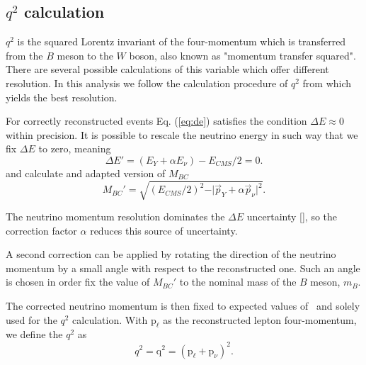\subsection{\texorpdfstring{$q^2$}{q2} calculation}
$q^2$ is the squared Lorentz invariant of the four-momentum which is transferred from the $B$ meson to the $W$ boson, also known as "momentum transfer squared". There are several possible calculations of this variable which offer different resolution. In this analysis we follow the calculation procedure of $q^2$ from \cite{VubCLEO} which yields the best resolution.

For correctly reconstructed events Eq. (\ref{eq:de}) satisfies the condition $\Delta E \approx 0$ within precision. It is possible to rescale the neutrino energy in such way that we fix $\Delta E$ to zero, meaning 
\begin{equation}
\Delta E' = (E_Y + \alpha E_\nu) - E_{CMS}/2 = 0.
\end{equation}
and calculate and adapted version of $M_{BC}$
\begin{equation}
M_{BC}' = \sqrt{\left(E_{CMS}/2\right)^2 - \vert \vec{p}_Y + \alpha \vec{p}_\nu \vert^2}.
\end{equation}

The neutrino momentum resolution dominates the $\Delta E$ uncertainty [], so the correction factor $\alpha$ reduces this source of uncertainty.

A second correction can be applied by rotating the direction of the neutrino momentum by a small angle with respect to the reconstructed one. Such an angle is chosen in order fix the value of $M_{BC}'$ to the nominal mass of the $B$ meson, $m_B$.

The corrected neutrino momentum is then fixed to expected values of \vars~and solely used for the $q^2$ calculation. With $\mathrm{p}_\ell$ as the reconstructed lepton four-momentum, we define the $q^2$ as
\begin{equation}
\label{eq:q2}
q^2 = \mathrm{q}^2 = \left(\mathrm{p}_\ell + \mathrm{p}_\nu \right)^2.
\end{equation}

